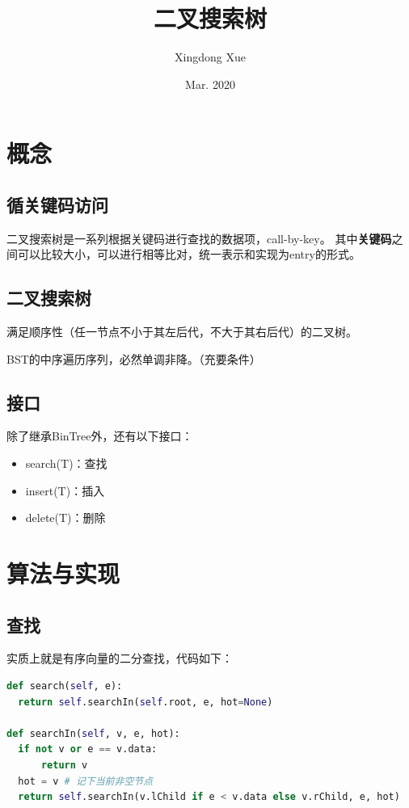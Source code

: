 \documentclass{article}
\title{二叉搜索树}
\author{Xingdong Xue}
\date{Mar. 2020}
\begin{document}
\maketitle

\section{概念}
\subsection{循关键码访问}

二叉搜索树是一系列根据关键码进行查找的数据项，call-by-key。
其中\textbf{关键码}之间可以比较大小，可以进行相等比对，统一表示和实现为entry的形式。

\subsection{二叉搜索树}

满足顺序性（任一节点不小于其左后代，不大于其右后代）的二叉树。

BST的中序遍历序列，必然单调非降。（充要条件）

\subsection{接口}

除了继承BinTree外，还有以下接口：
\begin{itemize}
  \item search(T)：查找
  \item insert(T)：插入
  \item delete(T)：删除
\end{itemize}

\section{算法与实现}
\subsection{查找}

实质上就是有序向量的二分查找，代码如下：
\begin{lstlisting}[language=Python]
def search(self, e):
  return self.searchIn(self.root, e, hot=None)

def searchIn(self, v, e, hot):
  if not v or e == v.data:
      return v
  hot = v # 记下当前非空节点
  return self.searchIn(v.lChild if e < v.data else v.rChild, e, hot)
\end{lstlisting}
\end{document}
